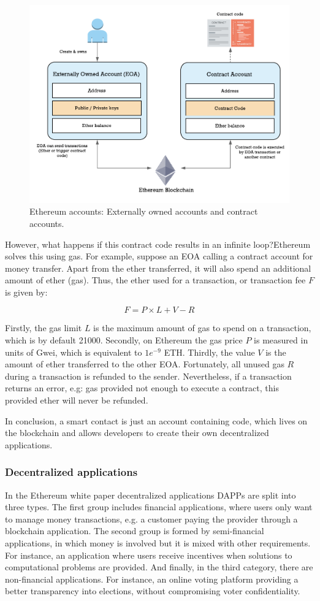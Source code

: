 \begin{figure}[bth]
  \centering
  \includegraphics[width=0.6\linewidth]{gfx/ethereumAccounts}    
  \caption{Ethereum accounts: Externally owned accounts and contract 			accounts.}
  \label{fig:EthereumAccounts}
\end{figure}

However, what happens if this contract code results in an infinite loop?Ethereum solves this using gas. For example, suppose an EOA calling a contract account for money transfer. Apart from the ether transferred, it will also spend an additional amount of ether (gas). Thus, the ether used for a transaction, or transaction fee $F$ is given by:

\begin{equation}
	F = P \times L + V - R
\end{equation}

Firstly, the gas limit $L$ is the maximum amount of gas to spend on a transaction, which is by default 21000. Secondly, on Ethereum the gas price $P$ is measured in units of Gwei, which is equivalent to $1e^{-9}$ ETH. Thirdly, the value $V$ is the amount of ether transferred to the other EOA. Fortunately, all unused gas $R$ during a transaction is refunded to the sender. Nevertheless, if a transaction returns an error, e.g: gas provided not enough to execute a contract, this provided ether will never be refunded. 

In conclusion, a smart contact is just an account containing code, which lives on the blockchain and allows developers to create their own decentralized applications. 

\subsubsection{Decentralized applications}

In the Ethereum white paper \cite{buterin2014next} decentralized applications DAPPs are split into three types. The first group includes financial applications, where users only want to manage money transactions, e.g. a customer paying the provider through a blockchain application. The second group is formed by semi-financial applications, in which money is involved but it is mixed with other requirements. For instance, an application where users receive incentives when solutions to computational problems are provided. And finally, in the third category, there are non-financial applications. For instance, an online voting platform providing a better transparency into elections, without compromising voter confidentiality.

